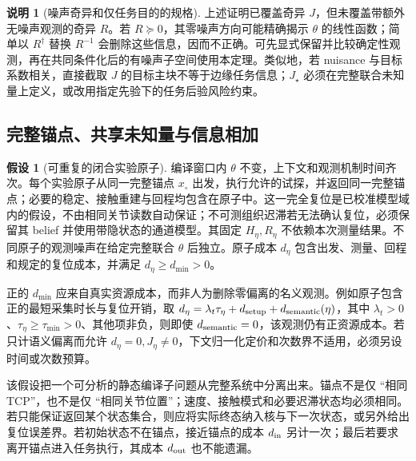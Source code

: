 \documentclass[11pt,a4paper]{article}
\numberwithin{equation}{section}
\theoremstyle{definition}
\newtheorem{assumption}[theorem]{假设}
\newtheorem{remark}[theorem]{说明}
\begin{document}
\begin{remark}[噪声奇异和仅任务目的的规格]
\label{cmp:singular-noise}
上述证明已覆盖奇异 $J$，但未覆盖带额外无噪声观测的奇异 $R$。若 $R\succeq0$，其零噪声方向可能精确揭示 $\theta$ 的线性函数；简单以 $R^\dagger$ 替换 $R^{-1}$ 会删除这些信息，因而不正确。可先显式保留并比较确定性观测，再在共同条件化后的有噪声子空间使用本定理。类似地，若 nuisance 与目标系数相关，直接截取 $J$ 的目标主块不等于边缘任务信息；$J_\star$ 必须在完整联合未知量上定义，或改用指定先验下的任务后验风险约束。
\end{remark}

\subsection{完整锚点、共享未知量与信息相加}
\label{cmp:anchors}

\begin{assumption}[可重复的闭合实验原子]
\label{cmp:anchor-assumption}
编译窗口内 $\theta$ 不变，上下文和观测机制时间齐次。每个实验原子从同一完整锚点 $x_\circ$ 出发，执行允许的试探，并返回同一完整锚点；必要的稳定、接触重建与回程均包含在原子中。这一完全复位是已校准模型域内的假设，不由相同关节读数自动保证；不可测组织迟滞若无法确认复位，必须保留其 belief 并使用带隐状态的通道模型。其固定 $H_\eta,R_\eta$ 不依赖本次测量结果。不同原子的观测噪声在给定完整联合 $\theta$ 后独立。原子成本 $d_\eta$ 包含出发、测量、回程和规定的复位成本，并满足 $d_\eta\ge d_{\min}>0$。
\end{assumption}

正的 $d_{\min}$ 应来自真实资源成本，而非人为删除零偏离的名义观测。例如原子包含正的最短采集时长与复位开销，取 $d_\eta=\lambda_t\tau_\eta+d_{\rm setup}+d_{\rm semantic}(\eta)$，其中 $\lambda_t>0$、$\tau_\eta\ge\tau_{\min}>0$、其他项非负，则即使 $d_{\rm semantic}=0$，该观测仍有正资源成本。若只计语义偏离而允许 $d_\eta=0,J_\eta\ne0$，下文归一化定价和次数界不适用，必须另设时间或次数预算。

该假设把一个可分析的静态编译子问题从完整系统中分离出来。锚点不是仅 ``相同 TCP''，也不是仅 ``相同关节位置''；速度、接触模式和必要迟滞状态均必须相同。若只能保证返回某个状态集合，则应将实际终态纳入核与下一次状态，或另外给出复位误差界。若初始状态不在锚点，接近锚点的成本 $d_{\rm in}$ 另计一次；最后若要求离开锚点进入任务执行，其成本 $d_{\rm out}$ 也不能遗漏。
\end{document}
